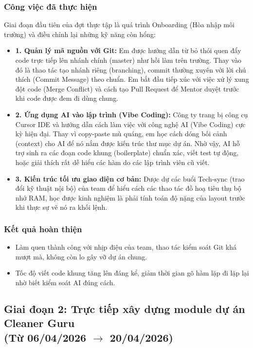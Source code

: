 \documentclass[12pt, a4paper]{article}
\begin{document}
\subsubsection{Công việc đã thực hiện}
Giai đoạn đầu tiên của đợt thực tập là quá trình Onboarding (Hòa nhập môi trường) và điều chỉnh lại những kỹ năng còn hổng:
\begin{itemize}
    \item \textbf{1. Quản lý mã nguồn với Git:} 
    Em được hướng dẫn từ bỏ thói quen đẩy code trực tiếp lên nhánh chính (master) như hồi làm trên trường. Thay vào đó là thao tác tạo nhánh riêng (branching), commit thường xuyên với lời chú thích (Commit Message) theo chuẩn. Em bắt đầu tiếp xúc với việc xử lý xung đột code (Merge Conflict) và cách tạo Pull Request để Mentor duyệt trước khi code được đem đi dùng chung.
    
    \item \textbf{2. Ứng dụng AI vào lập trình (Vibe Coding):} 
    Công ty trang bị công cụ Cursor IDE và hướng dẫn cách làm việc với công nghệ AI (Vibe Coding) cực kỳ hiện đại. Thay vì copy-paste mù quáng, em học cách dóng bối cảnh (context) cho AI để nó nắm được kiến trúc thư mục dự án. Nhờ vậy, AI hỗ trợ sinh ra các đoạn code khung (boilerplate) chuẩn xác, viết test tự động, hoặc giải thích rất dễ hiểu các hàm do các lập trình viên cũ viết.
    
    \item \textbf{3. Kiến trúc tối ưu giao diện cơ bản:}
    Được dự các buổi Tech-sync (trao đổi kỹ thuật nội bộ) của team để hiểu cách các thao tác đồ hoạ tiêu thụ bộ nhớ RAM, học được kinh nghiệm là phải tính toán độ nặng của layout trước khi thực sự vẽ nó ra khối lệnh.
\end{itemize}

\subsubsection{Kết quả hoàn thiện}
\begin{itemize}
    \item Làm quen thành công với nhịp điệu của team, thao tác kiểm soát Git khá mượt mà, không còn lo gây vỡ dự án chung.
    \item Tốc độ viết code khung tăng lên đáng kể, giảm thời gian gõ hàm lặp đi lặp lại nhờ biết kiểm soát AI đúng cách.
\end{itemize}

\subsection[Giai đoạn 2: Trực tiếp xây dựng module dự án Cleaner Guru (Từ 06/04/2026 đến 20/04/2026)]{Giai đoạn 2: Trực tiếp xây dựng module dự án Cleaner Guru \\(Từ 06/04/2026 $\rightarrow$ 20/04/2026)}
\end{document}
